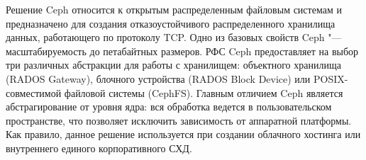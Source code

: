 \documentclass[10pt, a5paper]{article}
\begin{document}
Решение Ceph  относится к открытым распределенным файловым системам и предназначено для создания отказоустойчивого распределенного хранилища данных, работающего по протоколу TCP. Одно из базовых свойств Ceph "--- масштабируемость до петабайтных размеров. РФС Ceph предоставляет на выбор три различных абстракции для работы с хранилищем: объектного хранилища (RADOS Gateway), блочного устройства (RADOS Block Device) или POSIX-совместимой файловой системы (CephFS). Главным отличием Ceph является абстрагирование от уровня ядра: вся обработка ведется в пользовательском пространстве, что позволяет исключить зависимость от аппаратной платформы. Как правило, данное решение используется при создании облачного хостинга или внутреннего единого корпоративного СХД.
\end{document}
